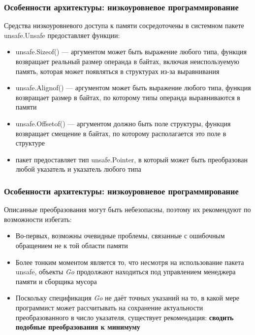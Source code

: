 \documentclass[11pt]{beamer}
\begin{document}
\begin{frame}
\frametitle{Особенности архитектуры: низкоуровневое программирование}
Средства низкоуровневого доступа к памяти сосредоточены в системном пакете {\color{yellow}unsafe}.{\color{yellow}Unsafe} предоставляет функции:
\begin{itemize} 
    \item {\color{blue}unsafe.Sizeof()} — аргументом может быть выражение любого типа, функция возвращает реальный размер операнда в байтах, включая неиспользуемую память, которая может появляться в структурах из-за выравнивания
    \item {\color{blue}unsafe.Alignof()} — аргументом может быть выражение любого типа, функция возвращает размер в байтах, по которому типы операнда выравниваются в памяти
    \item {\color{blue}unsafe.Offsetof()} — аргументом должно быть поле структуры, функция возвращает смещение в байтах, по которому располагается это поле в структуре
    \item пакет предоставляет тип {\color{brown}unsafe.Pointer}, в который может быть преобразован любой указатель и указатель любого типа
\end{itemize}
\end{frame}
\begin{frame}
\frametitle{Особенности архитектуры: низкоуровневое программирование}
Описанные преобразования могут быть небезопасны, поэтому их рекомендуют по возможности избегать:
\begin{itemize}
    \item Во-первых, возможны очевидные проблемы, связанные с ошибочным обращением не к той области памяти
    \item Более тонким моментом является то, что несмотря на использование пакета {\color{yellow}unsafe}, объекты \textit{Go} продолжают находиться под управлением менеджера памяти и {\color{green}сборщика мусора}
    \item Поскольку спецификация \textit{Go} не даёт точных указаний на то, в какой мере программист может рассчитывать на сохранение актуальности преобразованного в число указателя, существует рекомендация: \textbf{сводить подобные преобразования к минимуму}
\end{itemize}
\end{frame}
\end{document}
